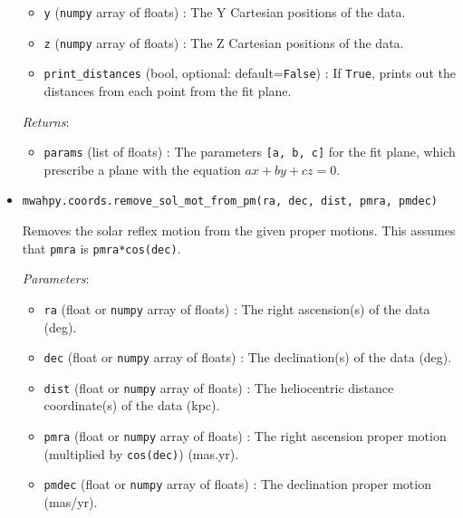 \documentclass{article}
\begin{document}
\begin{itemize}
\begin{itemize}
\item \verb!y! (\verb!numpy! array of floats) : The Y Cartesian positions of the data.

\item \verb!z! (\verb!numpy! array of floats) : The Z Cartesian positions of the data.

\item \verb!print_distances! (bool, optional: default=\verb!False!) : If \verb!True!, prints out the distances from each point from the fit plane. 

\end{itemize}

\textit{Returns}: \begin{itemize}

\item \verb!params! (list of floats) : The parameters \verb![a, b, c]! for the fit plane, which prescribe a plane with the equation $ax + by + cz = 0$. 

\end{itemize}



\item \verb!mwahpy.coords.remove_sol_mot_from_pm(ra, dec, dist, pmra, pmdec)!

Removes the solar reflex motion from the given proper motions. This assumes that \verb!pmra! is \verb!pmra*cos(dec)!.

\textit{Parameters}: \begin{itemize}

\item \verb!ra! (float or \verb!numpy! array of floats) : The right ascension(s) of the data (deg).

\item \verb!dec! (float or \verb!numpy! array of floats) : The declination(s) of the data (deg).

\item \verb!dist! (float or \verb!numpy! array of floats) : The heliocentric distance coordinate(s) of the data (kpc).

\item \verb!pmra! (float or \verb!numpy! array of floats) : The right ascension proper motion (multiplied by \verb!cos(dec)!) (mas.yr). 

\item \verb!pmdec! (float or \verb!numpy! array of floats) : The declination proper motion (mas/yr). 

\end{itemize}


\end{itemize}
\end{document}
